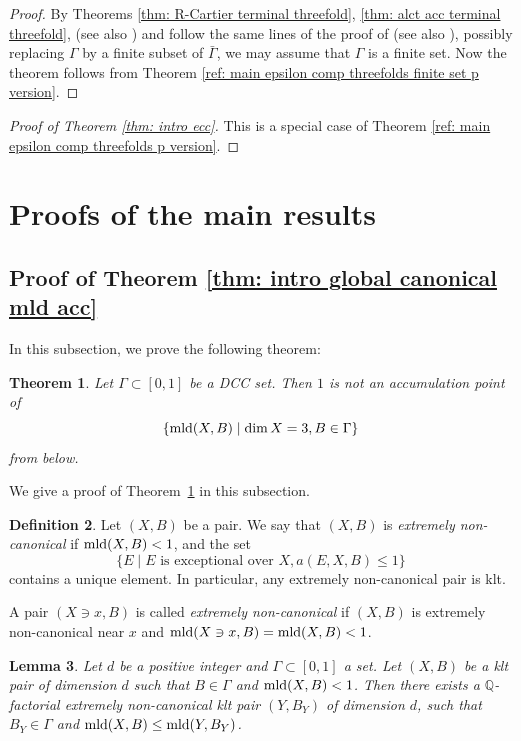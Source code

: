 \documentclass[11pt]{amsart}
\numberwithin{equation}{section}
\newcommand\han[1]{\todo[color=yellow!40]{#1}} %
\newcommand{\Qq}{\mathbb{Q}}
\newcommand{\mld}{{\rm{mld}}}
\newcommand{\Ii}{{\Gamma}}
\newtheorem{thm}{Theorem}[section]
\newtheorem{lem}[thm]{Lemma}
\theoremstyle{definition}
\theoremstyle{definition}
\newtheorem{defn}[thm]{Definition}
\begin{document}
\begin{proof}
By Theorems \ref{thm: R-Cartier terminal threefold}, \ref{thm: alct acc terminal threefold}, \cite[Lemma 5.17]{HLS19} (see also \cite[Lemma 5.5]{CH21}) and follow the same lines of the proof of \cite[Theorem 5.6]{CH21} (see also \cite[Theorem 5.18]{HLS19}), possibly replacing $\Ii$ by a finite subset of $\bar{\Ii}$, we may assume that $\Ii$ is a finite set. Now the theorem follows from Theorem \ref{ref: main epsilon comp threefolds finite set p version}.
\end{proof}


\begin{proof}[Proof of Theorem \ref{thm: intro ecc}] This is a special case of Theorem \ref{ref: main epsilon comp threefolds p version}.
\end{proof}


\section{Proofs of the main results}\label{section: Proofs of the main results}

\subsection{Proof of Theorem \ref{thm: intro global canonical mld acc}}

In this subsection, we prove the following theorem:

\begin{thm}\label{thm: 1-gap pair}
Let $\Ii\subset [0,1]$ be a DCC set. Then $1$ is not an accumulation point of $$\{\mld(X,B)\mid \dim X=3,B\in\Ii\}$$ from below. 
\end{thm}

We give a proof of Theorem~\ref{thm: 1-gap pair} in this subsection.



\begin{defn}
Let $(X,B)$ be a pair. We say that $(X,B)$ is \emph{extremely non-canonical} if $\mld(X,B)<1$, and the set
$$\{E\mid E\text{ is exceptional over }X, a(E,X,B)\leq 1\}$$
contains a unique element. In particular, any extremely non-canonical pair is klt.

A pair $(X\ni x,B)$ is called \emph{extremely non-canonical} if $(X,B)$ is extremely non-canonical near $x$ and $\mld(X\ni x,B)=\mld(X,B)<1$.
\end{defn}


\begin{lem}\label{lem: refduction to extremely canonical}
Let $d$ be a positive integer and $\Ii\subset [0,1]$ a set. Let $(X,B)$ be a klt pair of dimension $d$ such that $B\in\Ii$ and $\mld(X,B)<1$. Then there exists a $\Qq$-factorial extremely non-canonical klt pair $(Y,B_Y)$ of dimension $d$, such that $B_Y\in \Gamma$ and $\mld(X,B)\leq\mld(Y,B_Y)$.
\end{lem}
\end{document}
